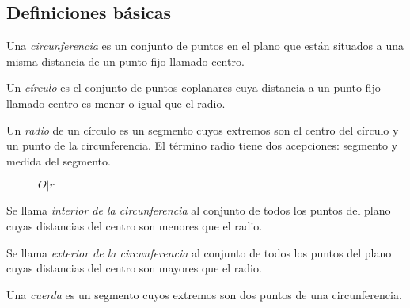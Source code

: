 \subsection{Definiciones básicas}

\begin{definition}
    Una \textit{circunferencia} es un conjunto de puntos en el plano que están situados a una misma distancia de un punto fijo llamado centro.
\end{definition}

\begin{definition}
    Un \textit{círculo} es el conjunto de puntos coplanares cuya distancia a un punto fijo llamado centro es menor o igual que el radio.
\end{definition}

\begin{definition}
    Un \textit{radio} de un círculo es un segmento cuyos extremos son el centro del círculo y un punto de la circunferencia. El término radio tiene dos acepciones: segmento y medida del segmento.
\end{definition}

\begin{figure}[!h]
    \centering
    
    \caption{$O|r$}
    \label{fig:circle}
\end{figure}

\begin{definition}
    Se llama \textit{interior de la circunferencia} al conjunto de todos los puntos del plano cuyas distancias del centro son menores que el radio.
\end{definition}

\begin{definition}
    Se llama \textit{exterior de la circunferencia} al conjunto de todos los puntos del plano cuyas distancias del centro son mayores que el radio.
\end{definition}

\clearpage

\begin{definition}
    Una \textit{cuerda} es un segmento cuyos extremos son dos puntos de una circunferencia.

    \begin{figure}[!h]
        \centering
        
        \label{fig:cord}
    \end{figure}
    
\end{definition}


